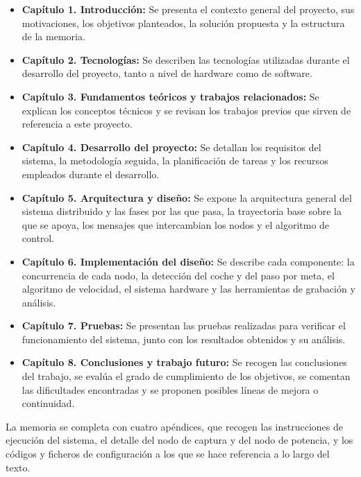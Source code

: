 \begin{itemize}
    \item \textbf{Capítulo 1. Introducción:} Se presenta el contexto general del proyecto, sus motivaciones, %
    los objetivos planteados, la solución propuesta y la estructura de %
    la memoria.

    \item \textbf{Capítulo 2. Tecnologías:} Se describen las tecnologías utilizadas durante el desarrollo del proyecto, tanto a nivel de hardware como de software.

    \item \textbf{Capítulo 3. Fundamentos teóricos y trabajos relacionados:} Se explican los conceptos técnicos y se revisan los trabajos previos que sirven de %
    referencia a este proyecto.

    \item \textbf{Capítulo 4. Desarrollo del proyecto:} Se detallan los requisitos del sistema, la metodología seguida, la planificación de tareas y los recursos empleados durante el %
    desarrollo.

    \item \textbf{Capítulo 5. Arquitectura y diseño:} Se expone la arquitectura general del sistema distribuido y las fases por las que pasa, la trayectoria base sobre la que se apoya, los mensajes que intercambian los nodos y el algoritmo de control.

    \item \textbf{Capítulo 6. Implementación del diseño:} Se describe cada componente: %
la concurrencia de cada nodo, la detección del coche y del paso por meta, el algoritmo de velocidad, el sistema hardware y las herramientas de grabación y análisis. %

    \item \textbf{Capítulo 7. Pruebas:} Se presentan las pruebas realizadas para verificar el funcionamiento del sistema, junto con los resultados obtenidos y su análisis.

    \item \textbf{Capítulo 8. Conclusiones y trabajo futuro:} Se recogen las conclusiones del trabajo, se evalúa el grado de cumplimiento de los objetivos, se comentan las dificultades encontradas y se proponen posibles líneas de mejora o continuidad.
\end{itemize}

La memoria se completa con cuatro apéndices, que recogen las instrucciones de ejecución del sistema, el detalle del nodo de captura y del nodo de potencia, y los códigos y ficheros de configuración a los que se hace referencia a lo largo del texto.
